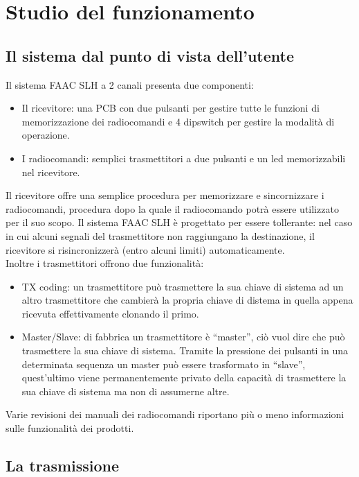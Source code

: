 \chapter{Studio del funzionamento}
\label{cha:analysis}

\section{Il sistema dal punto di vista dell'utente}
\label{sec:ux}

Il sistema FAAC SLH a 2 canali presenta due componenti:
\begin{itemize}
  \item Il ricevitore: una PCB con due pulsanti per gestire tutte le funzioni di memorizzazione dei radiocomandi e 4 dipswitch per gestire la modalità di operazione.
  \item I radiocomandi: semplici trasmettitori a due pulsanti e un led memorizzabili nel ricevitore.
\end{itemize}
Il ricevitore offre una semplice procedura per memorizzare e sincornizzare i radiocomandi, procedura dopo la quale il radiocomando potrà essere utilizzato per il suo scopo. Il sistema FAAC SLH è progettato per essere tollerante: nel caso in cui alcuni segnali del trasmettitore non raggiungano la destinazione, il ricevitore si risincronizzerà (entro alcuni limiti) automaticamente.\\
Inoltre i trasmettitori offrono due funzionalità:
\begin{itemize}
  \item TX coding: un trasmettitore può trasmettere la sua chiave di sistema ad un altro trasmettitore che cambierà la propria chiave di distema in quella appena ricevuta effettivamente clonando il primo.
  \item Master/Slave: di fabbrica un trasmettitore è “master”, ciò vuol dire che può trasmettere la sua chiave di sistema. Tramite la pressione dei pulsanti in una determinata sequenza un master può essere trasformato in “slave”, quest’ultimo viene permanentemente privato della capacità di trasmettere la sua chiave di sistema ma non di assumerne altre.
\end{itemize}
Varie revisioni dei manuali  \cite{man1,man2} dei radiocomandi riportano più o meno informazioni sulle funzionalità dei prodotti.

\section{La trasmissione}
\label{sec:transmission}

